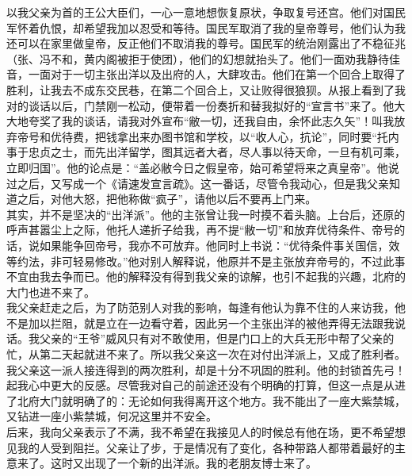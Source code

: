 以我父亲为首的王公大臣们，一心一意地想恢复原状，争取复号还宫。他们对国民军怀着仇恨，却希望我加以忍受和等待。国民军取消了我的皇帝尊号，他们认为我还可以在家里做皇帝，反正他们不取消我的尊号。国民军的统治刚露出了不稳征兆（张、冯不和，黄内阁被拒于使团），他们的幻想就抬头了。他们一面劝我静待佳音，一面对于一切主张出洋以及出府的人，大肆攻击。他们在第一个回合上取得了胜利，让我去不成东交民巷，在第二个回合上，又让败得很狼狈。从报上看到了我对的谈话以后，门禁刚一松动，便带着一份奏折和替我拟好的“宣言书”来了。他大大地夸奖了我的谈话，请我对外宣布“敝一切，还我自由，余怀此志久矢”！叫我放弃帝号和优待费，把钱拿出来办图书馆和学校，以“收人心，抗论”，同时要“托内事于忠贞之士，而先出洋留学，图其远者大者，尽人事以待天命，一旦有机可乘，立即归国”。他的论点是：“盖必敝今日之假皇帝，始可希望将来之真皇帝”。他说过之后，又写成一个《请速发宣言疏》。这一番话，尽管令我动心，但是我父亲知道之后，对他大怒，把他称做“疯子”，请他以后不要再上门来。\\

其实，并不是坚决的“出洋派”。他的主张曾让我一时摸不着头脑。上台后，还原的呼声甚嚣尘上之际，他托人递折子给我，再不提“敝一切”和放弃优待条件、帝号的话，说如果能争回帝号，我亦不可放弃。他同时上书说：“优待条件事关国信，效等约法，非可轻易修改。”他对别人解释说，他原并不是主张放弃帝号的，不过此事不宜由我去争而已。他的解释没有得到我父亲的谅解，也引不起我的兴趣，北府的大门也进不来了。\\

我父亲赶走之后，为了防范别人对我的影响，每逢有他认为靠不住的人来访我，他不是加以拦阻，就是立在一边看守着，因此另一个主张出洋的被他弄得无法跟我说话。我父亲的“王爷”威风只有对不敢使用，但是门口上的大兵无形中帮了父亲的忙，从第二天起就进不来了。所以我父亲这一次在对付出洋派上，又成了胜利者。\\

我父亲这一派人接连得到的两次胜利，却是十分不巩固的胜利。他的封锁首先弓！起我心中更大的反感。尽管我对自己的前途还没有个明确的打算，但这一点是从进了北府大门就明确了的：无论如何我得离开这个地方。我不能出了一座大紫禁城，又钻进一座小紫禁城，何况这里并不安全。\\

后来，我向父亲表示了不满，我不希望在我接见人的时候总有他在场，更不希望想见我的人受到阻拦。父亲让了步，于是情况有了变化，各种带路人都带着最好的主意来了。这时又出现了一个新的出洋派。我的老朋友博士来了。\\

